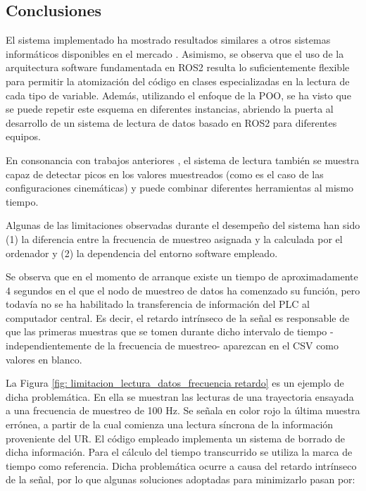 \subsection{Conclusiones}
El sistema implementado ha mostrado resultados similares a otros sistemas informáticos disponibles en el mercado \cite{ur_log_viewer_2024}. Asimismo, se observa que el uso de la arquitectura software fundamentada en ROS2 resulta lo suficientemente flexible para permitir la atomización del código en clases especializadas en la lectura de cada tipo de variable. Además, utilizando el enfoque de la \acrshort{POO}, se ha visto que se puede repetir este esquema en diferentes instancias, abriendo la puerta al desarrollo de un sistema de lectura de datos basado en ROS2 para diferentes equipos.

En consonancia con trabajos anteriores \cite{TFM_SanchoAmparo}\cite{TFM_Lu}, el sistema de lectura también se muestra capaz de detectar picos en los valores muestreados (como es el caso de las configuraciones cinemáticas) y puede combinar diferentes herramientas al mismo tiempo.

Algunas de las limitaciones observadas durante el desempeño del sistema han sido (1) la diferencia entre la frecuencia de muestreo asignada y la calculada por el ordenador y (2) la dependencia del entorno software empleado.

Se observa que en el momento de arranque existe un tiempo de aproximadamente 4 segundos en el que el nodo de muestreo de datos ha comenzado su función, pero todavía no se ha habilitado la transferencia de información del \acrshort{PLC} al computador central. Es decir, el retardo intrínseco de la señal es responsable de que las primeras muestras que se tomen durante dicho intervalo de tiempo -independientemente de la frecuencia de muestreo- aparezcan en el CSV como valores en blanco.

La Figura \ref{fig: limitacion_lectura_datos_frecuencia retardo} es un ejemplo de dicha problemática. En ella se muestran las lecturas de una trayectoria ensayada a una frecuencia de muestreo de 100 Hz. Se señala en color rojo la última muestra errónea, a partir de la cual comienza una lectura síncrona de la información proveniente del UR. El código empleado implementa un sistema de borrado de dicha información. Para el cálculo del tiempo transcurrido se utiliza la marca de tiempo como referencia. Dicha problemática ocurre a causa del retardo intrínseco de la señal, por lo que algunas soluciones adoptadas para minimizarlo pasan por:

